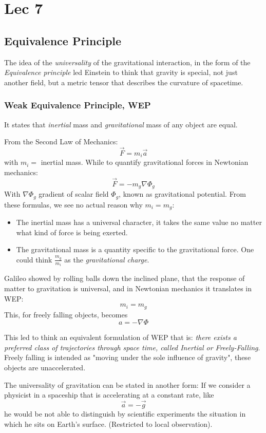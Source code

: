 \section{Lec 7}

\subsection{Equivalence Principle}

The idea of the \emph{universality} of the gravitational interaction, in the form of the \emph{Equivalence principle } led Einstein to think that gravity is special, not just another field, but a metric tensor that describes the curvature of spacetime.

\subsubsection{Weak Equivalence Principle, WEP}
It states that \emph{inertial} mass and \emph{gravitational} mass of any object are equal. \par
From the Second Law of Mechanics:
\[
 \vec{F}= m_{i}\vec{a}
\]
with $m_{i}=$ inertial mass.
While to quantify gravitational forces in Newtonian mechanics:
\[
\vec{F} = -m_{g} \nabla \Phi_{g}
\]
With $\nabla \Phi_{g}$ gradient of scalar field $\Phi_{g}$, known as gravitational potential.
From these formulas, we see no actual reason why $m_{i} = m_{g}$:
\begin{itemize}
	\item The inertial mass has a universal character, it takes the same value no matter what kind of force is being exerted.
	\item The gravitational mass is a quantity specific to the gravitational force. One could think $ \frac{m_{g}}{m_{i}}$ as the \emph{gravitational charge}.
\end{itemize}
Galileo showed by rolling balls down the inclined plane, that the response of matter to gravitation is universal, and in Newtonian mechanics it translates in WEP:
\[
m_{i }= m_{g}
\]
This, for freely falling objects, becomes
\[
a = -\nabla \Phi 
\]

This led to think an equivalent formulation of WEP that is: \emph{there exists a preferred class of trajectories through space time, called Inertial or Freely-Falling}.
Freely falling is intended as "moving under the sole influence of gravity", these objects are unaccelerated. \par

The universality of gravitation can be stated in another form:
\indent If we consider a physicist in a spaceship that is accelerating at a constant rate, like
\[
\vec{a} = - \vec{g}
\]
he would be not able to distinguish by scientific experiments the situation in which he sits on Earth's surface. (Restricted to local observation).


